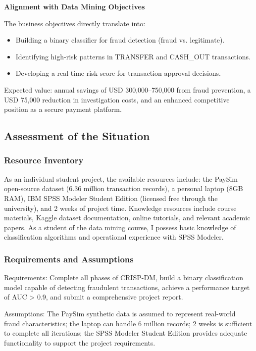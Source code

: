 \documentclass[sigplan,screen]{acmart}
\begin{document}
\textbf{Alignment with Data Mining Objectives}

The business objectives directly translate into:

\sloppy
\begin{itemize}
\item Building a binary classifier for fraud detection (fraud vs. legitimate).
\item Identifying high-risk patterns in TRANSFER and CASH\_OUT transactions.
\item Developing a real-time risk score for transaction approval decisions.
\end{itemize}
\fussy

Expected value: annual savings of USD 300,000--750,000 from fraud prevention, a USD 75,000 reduction in investigation costs, and an enhanced competitive position as a secure payment platform.

\subsection{ Assessment of the Situation}
\subsubsection{Resource Inventory}

As an individual student project, the available resources include: the PaySim open-source dataset (6.36 million transaction records), a personal laptop (8GB RAM), IBM SPSS Modeler Student Edition (licensed free through the university), and 2 weeks of project time. Knowledge resources include course materials, Kaggle dataset documentation, online tutorials, and relevant academic papers. As a student of the data mining course, I possess basic knowledge of classification algorithms and operational experience with SPSS Modeler.

\subsubsection{Requirements and Assumptions}

Requirements: Complete all phases of CRISP-DM, build a binary classification model capable of detecting fraudulent transactions, achieve a performance target of AUC > 0.9, and submit a comprehensive project report.

Assumptions: The PaySim synthetic data is assumed to represent real-world fraud characteristics; the laptop can handle 6 million records; 2 weeks is sufficient to complete all iterations; the SPSS Modeler Student Edition provides adequate functionality to support the project requirements.
\end{document}

